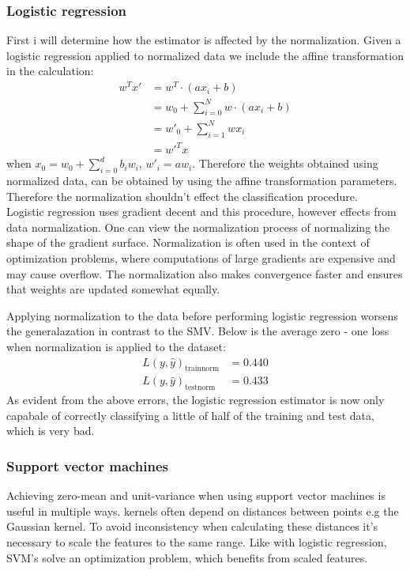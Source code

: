 \documentclass{article}
\begin{document}
\subsubsection{Logistic regression}
First i will determine how the estimator is affected by the normalization. Given a logistic regression applied to normalized data we include the affine transformation in the calculation:
\begin{align*}
w^Tx' &= w^T \cdot (a x_i +b) \\
&= w_0 + \sum\limits_{i=0}^N w \cdot (ax_i+b) \\ 
&= w'_0 + \sum\limits_{i=1}^N w x_i \\
&= w'^Tx
\end{align*}
when $x_0 = w_0 + \sum_{i=0}^d b_i w_i$, $ w'_i = a w_i$. Therefore the weights obtained using normalized data, can be obtained by using the affine transformation parameters. Therefore the normalization shouldn't effect the classification procedure. \\
Logistic regression uses gradient decent and this procedure, however effects from data normalization. One can view the normalization process of normalizing the shape of the gradient surface. Normalization is often  used in the context of optimization problems, where computations of large gradients are expensive and may cause overflow. The normalization also makes convergence faster and ensures that weights are updated somewhat equally.



Applying normalization to the data before performing logistic regression worsens the generalazation in contrast to the SMV. Below is the average zero - one loss when normalization is applied to the dataset:
\begin{align*}
L(y,\hat{y})_{\text{trainnorm}} &= 0.440 \\
L(y,\hat{y})_{\text{testnorm}} &= 0.433
\end{align*}
As evident from the above errors, the logistic regression estimator is now only capabale of correctly classifying a little of half of the training and test data, which is very bad.
\subsubsection{Support vector machines}
Achieving zero-mean and unit-variance when using support vector machines is useful in multiple ways. kernels often depend on distances between points e.g the Gaussian kernel. To avoid inconsistency when calculating these distances it's necessary to scale the features to the same range. Like with logistic regression, SVM's solve an optimization problem, which benefits from scaled features.
%
\end{document}

